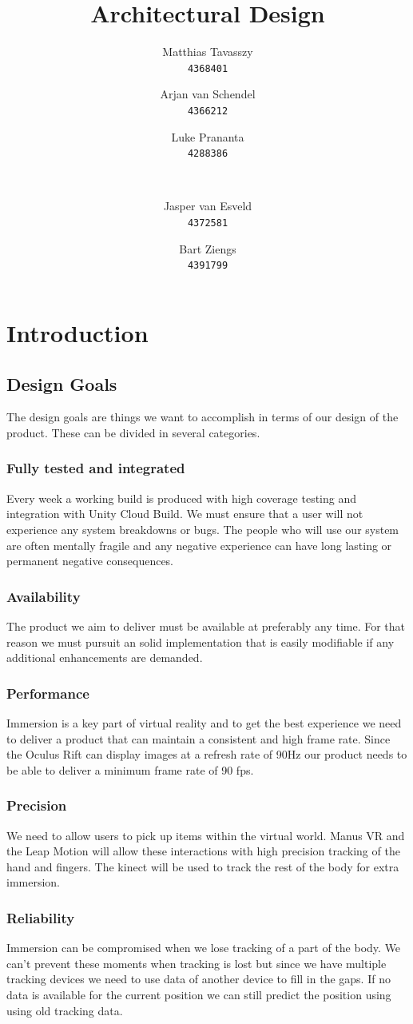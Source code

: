 \documentclass[11pt,a4paper]{report}
\title{Architectural Design }
\author{
	Matthias Tavasszy \\
	\texttt{4368401}	
	\and
	Arjan van Schendel \\
	\texttt{4366212}
	\and
	Luke Prananta \\ 
	\texttt{4288386}  
	\and
	$$\\
	\texttt{}
	\and
	Jasper van Esveld \\
	\texttt{4372581}
	\and
	Bart Ziengs \\ 
	\texttt{4391799}
}
\begin{document}
\maketitle


\tableofcontents
\chapter*{Introduction}
\section*{Design Goals}
The design goals are things we want to accomplish in terms of our design of the product.
These can be divided in several categories.
\subsection*{Fully tested and integrated}
Every week a working build is produced with high coverage testing and integration with
Unity Cloud Build. We must ensure that a user will not experience any system breakdowns or
bugs. The people who will use our system are often mentally fragile and any negative
experience can have long lasting or permanent negative consequences.
\subsection*{Availability}
The product we aim to deliver must be available at preferably any time. For that reason we must pursuit an solid implementation that is easily modifiable if any additional enhancements are demanded. 
\subsection*{Performance}
Immersion is a key part of virtual reality and to get the best experience we need to deliver a
product that can maintain a consistent and high frame rate. Since the Oculus Rift can display
images at a refresh rate of 90Hz our product needs to be able to deliver a minimum frame rate
of 90 fps.
\subsection*{Precision}
We need to allow users to pick up items within the virtual world. Manus VR and the Leap
Motion will allow these interactions with high precision tracking of the hand and fingers. The
kinect will be used to track the rest of the body for extra immersion.
\subsection*{Reliability}
Immersion can be compromised when we lose tracking of a part of the body. We can’t
prevent these moments when tracking is lost but since we have multiple tracking devices we
need to use data of another device to fill in the gaps. If no data is available for the current
position we can still predict the position using using old tracking data.
\end{document}
